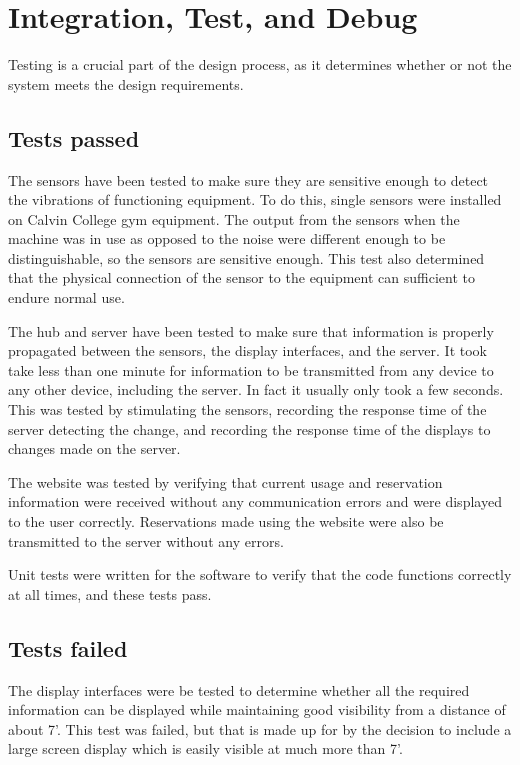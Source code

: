 \documentclass[PPFS.tex]{template/subfiles}
\begin{document}
\section{Integration, Test, and Debug}
Testing is a crucial part of the design process, as it determines whether or not the system meets the design requirements.

\subsection{Tests passed}
The sensors have been tested to make sure they are sensitive enough to detect the vibrations of functioning equipment.  To do this, single sensors were installed on Calvin College gym equipment. The output from the sensors when the machine was in use as opposed to the noise were different enough to be distinguishable, so the sensors are sensitive enough. This test also determined that the physical connection of the sensor to the equipment can sufficient to endure normal use.

The hub and server have been tested to make sure that information is properly propagated between the sensors, the display interfaces, and the server. It took take less than one minute for information to be transmitted from any device to any other device, including the server. In fact it usually only took a few seconds. This was tested by stimulating the sensors, recording the response time of the server detecting the change, and recording the response time of the displays to changes made on the server.

The website was tested by verifying that current usage and reservation information were received without any communication errors and were displayed to the user correctly. Reservations made using the website were also be transmitted to the server without any errors.

Unit tests were written for the software to verify that the code functions correctly at all times, and these tests pass.
\subsection{Tests failed}
The display interfaces were be tested to determine whether all the required information can be displayed while maintaining good visibility from a distance of about 7'. This test was failed, but that is made up for by the decision to include a large screen display which is easily visible at much more than 7'.
\end{document}
